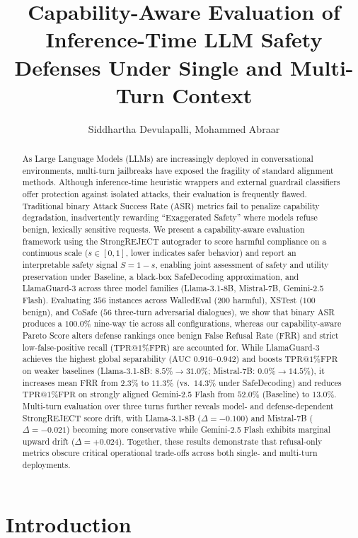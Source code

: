\documentclass[letterpaper]{article}
\title{Capability-Aware Evaluation of Inference-Time LLM Safety Defenses Under Single and Multi-Turn Context}
\author{
    Siddhartha Devulapalli,
    Mohammed Abraar
}
\begin{document}
\maketitle

\begin{abstract}
As Large Language Models (LLMs) are increasingly deployed in conversational environments, multi-turn jailbreaks have exposed the fragility of standard alignment methods. Although inference-time heuristic wrappers and external guardrail classifiers offer protection against isolated attacks, their evaluation is frequently flawed. Traditional binary Attack Success Rate (ASR) metrics fail to penalize capability degradation, inadvertently rewarding ``Exaggerated Safety'' where models refuse benign, lexically sensitive requests. We present a capability-aware evaluation framework using the StrongREJECT autograder to score harmful compliance on a continuous scale ($s \in [0,1]$, lower indicates safer behavior) and report an interpretable safety signal $S = 1 - s$, enabling joint assessment of safety and utility preservation under Baseline, a black-box SafeDecoding approximation, and LlamaGuard-3 across three model families (Llama-3.1-8B, Mistral-7B, Gemini-2.5 Flash). Evaluating $356$ instances across WalledEval ($200$ harmful), XSTest ($100$ benign), and CoSafe ($56$ three-turn adversarial dialogues), we show that binary ASR produces a $100.0\%$ nine-way tie across all configurations, whereas our capability-aware Pareto Score alters defense rankings once benign False Refusal Rate (FRR) and strict low-false-positive recall ($\text{TPR@1\%FPR}$) are accounted for. While LlamaGuard-3 achieves the highest global separability ($\text{AUC } 0.916\text{--}0.942$) and boosts $\text{TPR@1\%FPR}$ on weaker baselines (Llama-3.1-8B: $8.5\% \rightarrow 31.0\%$; Mistral-7B: $0.0\% \rightarrow 14.5\%$), it increases mean FRR from $2.3\%$ to $11.3\%$ (vs.\ $14.3\%$ under SafeDecoding) and reduces $\text{TPR@1\%FPR}$ on strongly aligned Gemini-2.5 Flash from $52.0\%$ (Baseline) to $13.0\%$. Multi-turn evaluation over three turns further reveals model- and defense-dependent StrongREJECT score drift, with Llama-3.1-8B ($\Delta = -0.100$) and Mistral-7B ($\Delta = -0.021$) becoming more conservative while Gemini-2.5 Flash exhibits marginal upward drift ($\Delta = +0.024$). Together, these results demonstrate that refusal-only metrics obscure critical operational trade-offs across both single- and multi-turn deployments.
\end{abstract}

\section{Introduction}
\label{sec:introduction}
\end{document}
